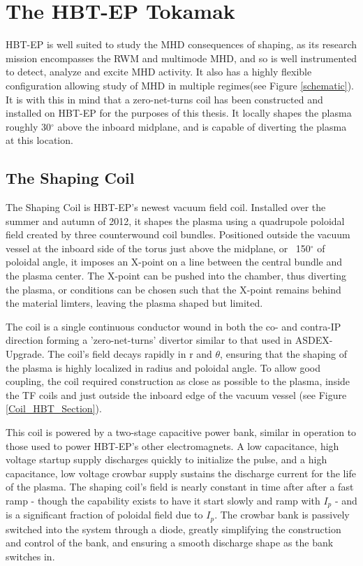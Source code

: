 \documentclass[aps,prl,twocolumn,superscriptaddress,groupedaddress]{revtex4}  %
\begin{document}

\section{The HBT-EP Tokamak}
	HBT-EP is well suited to study the MHD consequences of shaping, as its research mission encompasses the RWM and multimode MHD, and so is well instrumented to detect, analyze and excite MHD activity.  It also has a highly flexible configuration allowing study of MHD in multiple regimes(see Figure \ref{schematic}). It is with this in mind that a zero-net-turns coil has been constructed and installed on HBT-EP for the purposes of this thesis.  It locally shapes the plasma roughly 30${^\circ}$ above the inboard midplane, and is capable of diverting the plasma at this location.
\subsection{The Shaping Coil}
    The Shaping Coil is HBT-EP's newest vacuum field coil.  Installed over the summer and autumn of 2012, it shapes the plasma using a quadrupole poloidal field created by three counterwound coil bundles.  Positioned outside the vacuum vessel at the inboard side of the torus just above the midplane, or ~150$^{\circ}$ of poloidal angle, it imposes an X-point on a line between the central bundle and the plasma center.  The X-point can be pushed into the chamber, thus diverting the plasma, or conditions can be chosen such that the X-point remains behind the material limters, leaving the plasma shaped but limited.\par
    The coil is a single continuous conductor wound in both the co- and contra-IP direction forming a 'zero-net-turns' divertor similar to that used in ASDEX-Upgrade\cite{Keilhacker}.  The coil's field decays rapidly in r and $\theta$, ensuring that the shaping of the plasma is highly localized in radius and poloidal angle.  To allow good coupling, the coil required construction as close as possible to the plasma, inside the TF coils and just outside the inboard edge of the vacuum vessel (see Figure \ref{Coil_HBT_Section}).\par
This coil is powered by a two-stage capacitive power bank, similar in operation to those used to power HBT-EP's other electromagnets\cite{Gates}. A low capacitance, high voltage startup supply discharges quickly to initialize the pulse, and a high capacitance, low voltage crowbar supply sustains the discharge current for the life of the plasma.  The shaping coil's field is nearly constant in time after after a fast ramp - though the capability exists to have it start slowly and ramp with $I_p$ - and is a significant fraction of poloidal field due to $I_p$.  The crowbar bank is passively switched into the system through a diode, greatly simplifying the construction and control of the bank, and ensuring a smooth discharge shape as the bank switches in.
\end{document}
